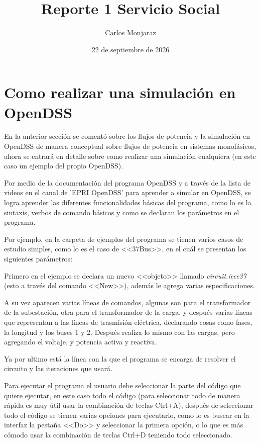 \documentclass[11pt, letterpaper]{article}
\title{Reporte 1 Servicio Social}
\author{Carlos Monjaraz}
\date{22 de septiembre de 2026}
\begin{document}
 
\maketitle

\section{Como realizar una simulación en OpenDSS}

En la anterior sección se comentó sobre los flujos de potencia y la simulación en OpenDSS de manera conceptual sobre
flujos de potencia en sistemas monofásicos, ahora se entrará en detalle sobre como realizar una simulación cualquiera (en este caso un
ejemplo del propio OpenDSS).

Por medio de la documentación del programa OpenDSS y a través de la
lista de videos en el canal de 'EPRI OpenDSS' para aprender a simular 
en OpenDSS, se logra aprender las diferentes funcionalidades básicas del programa,
como lo es la sintaxis, verbos de comando básicos y como se declaran los parámetros 
en el programa.

Por ejemplo, en la carpeta de ejemplos del programa se tienen varios casos de estudio simples,
como lo es el caso de <<37Bus>>, en el cuál se presentan los siguientes parámetros:

Primero en el ejemplo se declara un nuevo <<objeto>> llamado \textit{circuit.ieee37} (esto a través del 
comando <<New>>), además le agrega varias especificaciones.

A su vez aparecen varias líneas de comandos, algunas son para el transformador de la subestación, otra
para el transformador de la carga, y después varias líneas que representan a las líneas de trasmisión eléctrica,
declarando cosas como fases, la longitud y los buses 1 y 2.
Después realiza lo mismo con las cargas, pero agregando el voltaje, y potencia activa y reactiva.

Ya por ultimo está la línea con la que el programa se encarga de resolver el circuito y las iteraciones que usará.

Para ejecutar el programa el usuario debe seleccionar la parte del código que quiere ejecutar, en este caso todo el
código (para seleccionar todo de manera rápida es muy útil usar la combinación de teclas Ctrl+A), después de seleccionar
todo el código se tienen varias opciones para ejecutarlo, como lo es buscar en la interfaz la pestaña <<Do>> y seleccionar la
primera opción, o lo que es más cómodo usar la combinación de teclas Ctrl+D teniendo todo seleccionado.
\end{document}
